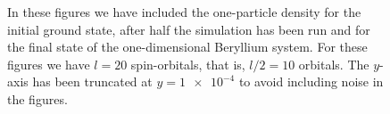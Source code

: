 \begin{figure}
                \caption{In these figures we have included the one-particle
                density for the initial ground state, after half the simulation
                has been run and for the final state of the one-dimensional
                Beryllium system.
                For these figures we have $l = 20$ spin-orbitals, that is, $l /
                2 = 10$ orbitals.
                The $y$-axis has been truncated at $y = \num{1e-4}$ to avoid
                including noise in the figures.}
                \label{fig:one-particle-density-miyagi}
            \end{figure}


